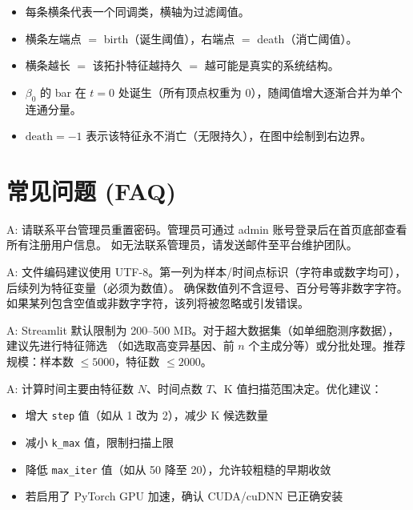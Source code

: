 \documentclass[12pt,a4paper]{ctexart}
\newcommand{\param}[1]{\texttt{#1}}
\begin{document}
\begin{infobox}[如何读条形码图]
    \begin{itemize}[leftmargin=*]
        \item 每条横条代表一个同调类，横轴为过滤阈值。
        \item 横条左端点 $=$ birth（诞生阈值），右端点 $=$ death（消亡阈值）。
        \item 横条越长 $=$ 该拓扑特征越持久 $=$ 越可能是真实的系统结构。
        \item $\beta_0$ 的 bar 在 $t = 0$ 处诞生（所有顶点权重为 0），随阈值增大逐渐合并为单个连通分量。
        \item $\text{death} = -1$ 表示该特征永不消亡（无限持久），在图中绘制到右边界。
    \end{itemize}
\end{infobox}

\section{常见问题 (FAQ)}

\begin{infobox}[Q: 忘记密码怎么办？]
    A: 请联系平台管理员重置密码。管理员可通过 admin 账号登录后在首页底部查看所有注册用户信息。
    如无法联系管理员，请发送邮件至平台维护团队。
\end{infobox}

\medskip
\begin{infobox}
    A: 文件编码建议使用 UTF-8。第一列为样本/时间点标识（字符串或数字均可），后续列为特征变量（必须为数值）。
    确保数值列不含逗号、百分号等非数字字符。如果某列包含空值或非数字字符，该列将被忽略或引发错误。
\end{infobox}

\medskip
\begin{infobox}[Q: 上传文件大小有限制吗？]
    A: Streamlit 默认限制为 200--500 MB。对于超大数据集（如单细胞测序数据），建议先进行特征筛选
    （如选取高变异基因、前 $n$ 个主成分等）或分批处理。推荐规模：样本数 $\leq 5000$，特征数 $\leq 2000$。
\end{infobox}

\medskip
\begin{infobox}
    A: 计算时间主要由特征数 $N$、时间点数 $T$、K 值扫描范围决定。优化建议：
    \begin{itemize}
        \item 增大 \param{step} 值（如从 1 改为 2），减少 K 候选数量
        \item 减小 \param{k\_max} 值，限制扫描上限
        \item 降低 \param{max\_iter} 值（如从 50 降至 20），允许较粗糙的早期收敛
        \item 若启用了 PyTorch GPU 加速，确认 CUDA/cuDNN 已正确安装
    \end{itemize}
\end{infobox}
\end{document}
